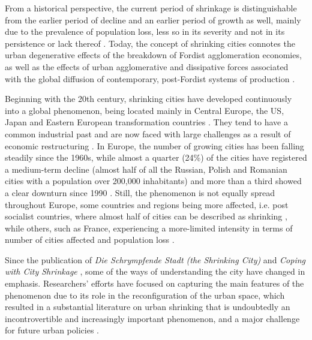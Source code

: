 From a historical perspective, the current period of shrinkage is distinguishable from the earlier period of decline and an earlier period of growth as well, mainly due to the prevalence of population loss, less so in its severity and not in its persistence or lack thereof \citep{beauregard_shrinking_2013}. Today, the concept of shrinking cities connotes the urban degenerative effects of the breakdown of Fordist agglomeration economies, as well as the effects of urban agglomerative and dissipative forces associated with the global diffusion of contemporary, post-Fordist systems of production \citep{audirac_shrinking_2014}.

Beginning with the 20th century, shrinking cities have developed continuously into a global phenomenon, being located mainly in Central Europe, the US, Japan and Eastern European transformation countries \citep{oswalt_atlas_2006}. They tend to have a common industrial past and are now faced with large challenges as a result of economic restructuring \citep{urban_audit_state_2007}. In Europe, the number of growing cities has been falling steadily since the 1960s, while almost a quarter (24\%) of the cities have registered a medium-term decline (almost half of all the Russian, Polish and Romanian cities with a population over 200,000 inhabitants) and more than a third showed a clear downturn since 1990 \citep{turok_trajectories_2007}. Still, the phenomenon is not equally spread throughout Europe, some countries and regions being more affected, i.e. post socialist countries, where almost half of cities can be described as shrinking \citep{wiechmann_urban_2013}, while others, such as France, experiencing a more-limited intensity in terms of number of cities affected and population loss \citep{wolff_shrinking_2013}.

Since the publication of \textit{Die Schrympfende Stadt (the Shrinking City)} \citep{gob_schrumpfende_1977} and \textit{Coping with City Shrinkage} \citep{breckenfeld_coping_1978}, some of the ways of understanding the city have changed in emphasis. Researchers’ efforts have focused on capturing the main features of the phenomenon due to its role in the reconfiguration of the urban space, which resulted in a substantial literature on urban shrinking that is undoubtedly an incontrovertible and increasingly important phenomenon, and a major challenge for future urban policies \citep{agirre-maskariano_politiques_2019, bernt_policy_2012, mallach_shrinking_2017, nelle_urban_2017, pallagst_viewpoint_2010, wiechmann_responding_2015, wiechmann_urban_2013}.

